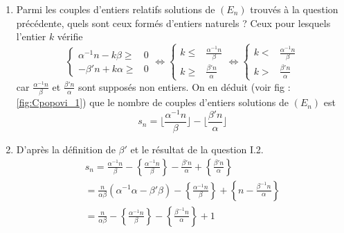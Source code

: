 \begin{enumerate}
\begin{enumerate}
\item Parmi les couples d'entiers relatifs solutions de $(E_n)$ trouvés à la question précédente, quels sont ceux formés d'entiers naturels ?\newline
Ceux pour lesquels l'entier $k$ vérifie
\begin{displaymath}
\left\lbrace
\begin{aligned}
 \alpha^{-1}n -k\beta \geq& 0 \\
 -\beta'n+k\alpha \geq& 0 
\end{aligned}
\right. 
 \Leftrightarrow
\left\lbrace 
\begin{aligned}
 k\leq& \frac{\alpha^{-1}n}{\beta}\\
 k\geq& \frac{\beta'n}{\alpha}
\end{aligned}
\right. 
 \Leftrightarrow
\left\lbrace 
\begin{aligned}
 k <& \frac{\alpha^{-1}n}{\beta}\\
 k >& \frac{\beta'n}{\alpha}
\end{aligned}
\right. 
\end{displaymath}
car $\frac{\alpha^{-1}n}{\beta}$ et $\frac{\beta'n}{\alpha}$ sont supposés non entiers. On en déduit (voir fig : \ref{fig:Cpopovi_1}) que le nombre de couples d'entiers solutions de $(E_n)$ est
\begin{displaymath}
 s_n = \lfloor\frac{\alpha^{-1}n}{\beta}\rfloor - \lfloor\frac{\beta'n}{\alpha}\rfloor
\end{displaymath}

\item D'après la définition de $\beta'$ et le résultat de la question I.2.
\begin{multline*}
 s_n = \frac{\alpha^{-1}n}{\beta} -\left\lbrace \frac{\alpha^{-1}n}{\beta}\right\rbrace
- \frac{\beta'n}{\alpha} + \left\lbrace \frac{\beta'n}{\alpha}\right\rbrace\\
=  \frac{n}{\alpha \beta}(\alpha^{-1}\alpha - \beta'\beta)-\left\lbrace \frac{\alpha^{-1}n}{\beta}\right\rbrace
+\left\lbrace n-\frac{\beta^{-1}n}{\alpha}\right\rbrace \\
= \frac{n}{\alpha \beta} -\left\lbrace \frac{\alpha^{-1}n}{\beta}\right\rbrace
-\left\lbrace \frac{\beta^{-1}n}{\alpha}\right\rbrace +1
\end{multline*}
\end{enumerate}


\end{enumerate}
